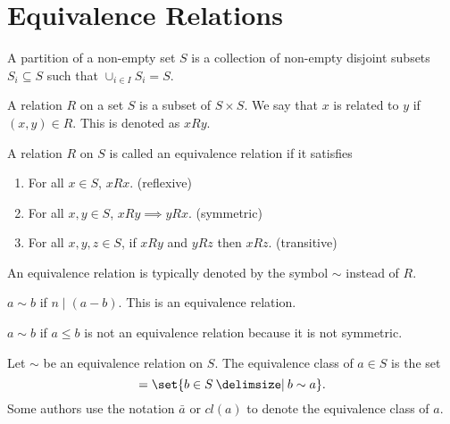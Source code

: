 \documentclass[11pt]{penrose}
\newcommand{\keyword}[1]{\textsf{#1}}
\begin{document}
\section{Equivalence Relations}
\begin{ndfn}
    A \keyword{partition} of a non-empty set $S$ is a collection of non-empty disjoint subsets $S_i \subseteq S$ such that $\cup_{i \in I} S_i = S$.
\end{ndfn}

\begin{ndfn}
    A \keyword{relation} $R$ on a set $S$ is a subset of $S \times S$. We say that $x$ is related to $y$ if $(x,y) \in R$. This is denoted as $xRy$.
\end{ndfn}

\begin{ndfn}
    A relation $R$ on $S$ is called an \keyword{equivalence relation} if it satisfies
    \begin{enumerate}[label=(\roman*)]
        \item For all $x \in S$, $xRx$. \hfill(\keyword{reflexive})
        \item For all $x, y \in S$, $xRy \implies yRx$. \hfill(\keyword{symmetric})
        \item For all $x, y, z \in S$, if $xRy$ and $yRz$ then $xRz$. \hfill(\keyword{transitive})
    \end{enumerate}
    An equivalence relation is typically denoted by the symbol $\sim$ instead of $R$.
\end{ndfn}

\begin{negg}
    $a \sim b$ if $n \mid (a-b)$. This is an equivalence relation.
\end{negg}

\begin{negg}
    $a \sim b$ if $a \leq b$ is not an equivalence relation because it is not symmetric.
\end{negg}

\begin{ndfn}
    Let $\sim$ be an equivalence relation on $S$. The equivalence class of $a \in S$ is the set
    \begin{equation*}
        [a] = \set{b \in S \st b \sim a}.
    \end{equation*}
    Some authors use the notation $\bar{a}$ or $cl(a)$ to denote the equivalence class of $a$.
\end{ndfn}
\end{document}

